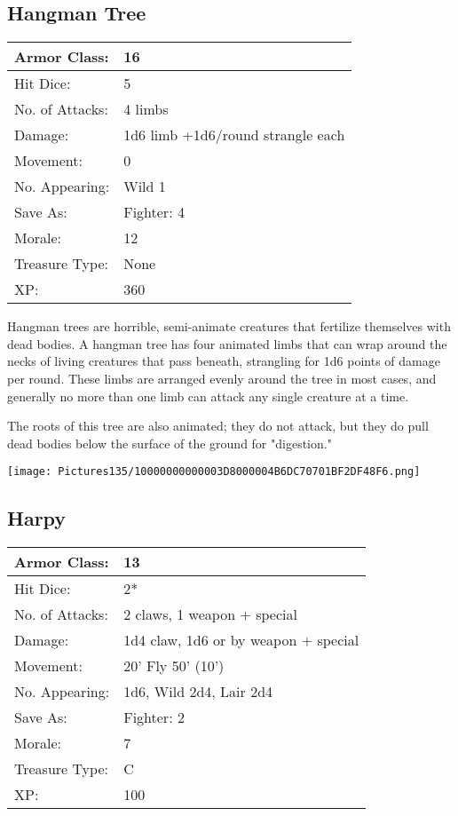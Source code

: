 \documentclass[a4paper,twoside,openany,10pt]{book}
\begin{document}
\begin{multicols}{2}
\subsection*{Hangman Tree}\label{hangman-tree}

\begin{tabularx}{0.48\textwidth}{@{}lX@{}}
Armor Class: & 16 \\\hline
Hit Dice: & 5 \\\hline
No. of Attacks: & 4 limbs \\\hline
Damage: & 1d6 limb +1d6/round strangle each \\\hline
Movement: & 0 \\\hline
No. Appearing: & Wild 1 \\\hline
Save As: & Fighter: 4 \\\hline
Morale: & 12 \\\hline
Treasure Type: & None \\\hline
XP: & 360 \\\hline
\end{tabularx}\medskip

Hangman trees are horrible, semi-animate creatures that fertilize themselves with dead bodies. A hangman tree has four animated limbs that can wrap around the necks of living creatures that pass beneath, strangling for 1d6 points of damage per round. These limbs are arranged evenly around the tree in most cases, and generally no more than one limb can attack any single creature at a time.

The roots of this tree are also animated; they do not attack, but they do pull dead bodies below the surface of the ground for "digestion."

\begin{center}
	\texttt{[image: Pictures135/10000000000003D8000004B6DC70701BF2DF48F6.png]}
\end{center}

\subsection*{Harpy}\label{harpy}

\begin{tabularx}{0.48\textwidth}{@{}lX@{}}
Armor Class: & 13 \\\hline
Hit Dice: & 2* \\\hline
No. of Attacks: & 2 claws, 1 weapon + special \\\hline
Damage: & 1d4 claw, 1d6 or by weapon + special \\\hline
Movement: & 20' Fly 50'
(10') \\\hline
No. Appearing: & 1d6, Wild 2d4, Lair 2d4 \\\hline
Save As: & Fighter: 2 \\\hline
Morale: & 7 \\\hline
Treasure Type: & C \\\hline
XP: & 100 \\\hline
\end{tabularx}\medskip


\end{multicols}
\end{document}
